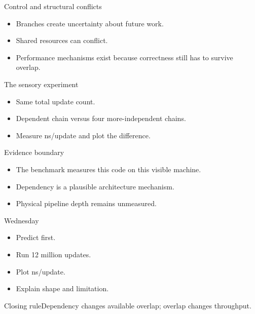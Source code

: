 \documentclass{beamer}
\begin{document}
\begin{frame}{Control and structural conflicts}\begin{itemize}\item Branches create uncertainty about future work.\item Shared resources can conflict.\item Performance mechanisms exist because correctness still has to survive overlap.\end{itemize}\end{frame}
\begin{frame}{The sensory experiment}\begin{itemize}\item Same total update count.\item Dependent chain versus four more-independent chains.\item Measure ns/update and plot the difference.\end{itemize}\end{frame}
\begin{frame}{Evidence boundary}\begin{itemize}\item The benchmark measures this code on this visible machine.\item Dependency is a plausible architecture mechanism.\item Physical pipeline depth remains unmeasured.\end{itemize}\end{frame}
\begin{frame}{Wednesday}\begin{itemize}\item Predict first.\item Run 12 million updates.\item Plot ns/update.\item Explain shape and limitation.\end{itemize}\end{frame}
\begin{frame}{Closing rule}\centering\Large Dependency changes available overlap; overlap changes throughput.\end{frame}
\end{document}
